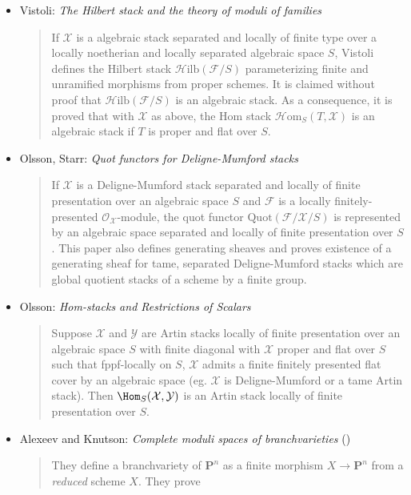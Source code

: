 \begin{itemize}
\item Vistoli: \emph{The Hilbert stack and the theory of moduli of families}
\cite{vistoli_hilbert}
\begin{quote}
If $\mathcal{X}$ is a algebraic stack separated and locally of finite type
over a locally noetherian and locally separated algebraic space $S$, Vistoli
defines the Hilbert stack $\mathcal{H}\text{ilb}(\mathcal{F} / S)$
parameterizing finite and unramified morphisms from proper schemes.
It is claimed without proof that $\mathcal{H}\text{ilb}(\mathcal{F} / S)$
is an algebraic stack. As a consequence, it is proved that with $\mathcal{X}$
as above, the Hom stack $\mathcal{H} \text{om}_S(T, \mathcal{X})$ is an
algebraic stack if $T$ is proper and flat over $S$.
\end{quote}
\item Olsson, Starr: \emph{Quot functors for Deligne-Mumford stacks}
\cite{olsson-starr}
\begin{quote}
If $\mathcal{X}$ is a Deligne-Mumford stack separated and locally of finite
presentation over an algebraic space $S$ and $\mathcal{F}$ is a locally
finitely-presented $\mathcal{O}_\mathcal{X}$-module, the quot functor
$\text{Quot}(\mathcal{F} / \mathcal{X} / S)$ is represented by an algebraic
space separated and locally of finite presentation over $S$. This paper
also defines generating sheaves and proves existence of a generating sheaf
for tame, separated Deligne-Mumford stacks which are global quotient stacks
of a scheme by a finite group.
\end{quote}
\item Olsson: \emph{Hom-stacks and Restrictions of Scalars}
\cite{olsson_homstacks}
\begin{quote}
Suppose $\mathcal{X}$ and $\mathcal{Y}$ are Artin stacks locally of finite
presentation over an algebraic space $S$ with finite diagonal with
$\mathcal{X}$ proper and flat over $S$ such that fppf-locally on $S$,
$\mathcal{X}$ admits a finite finitely presented flat cover by an algebraic
space (eg. $\mathcal{X}$ is Deligne-Mumford or a tame Artin stack).
Then $\Hom_S(\mathcal{X}, \mathcal{Y})$ is an Artin stack locally
of finite presentation over $S$.
\end{quote}
\item Alexeev and Knutson: \emph{Complete moduli spaces of branchvarieties}
(\cite{alexeev-knutson})
\begin{quote}
They define a branchvariety of $\mathbf{P}^n$ as a finite morphism
$X \rightarrow \mathbf{P}^n$ from a \emph{reduced} scheme $X$. They prove

\end{quote}
\end{itemize}
